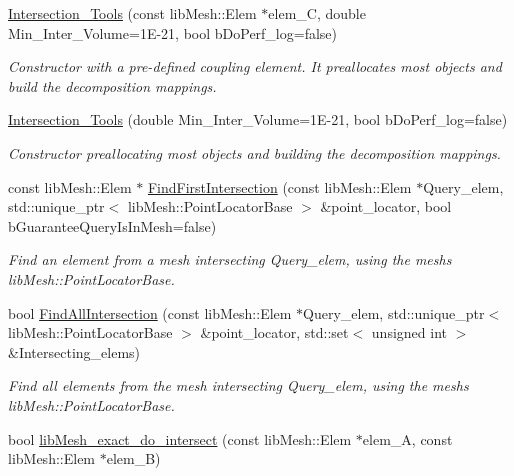 \begin{DoxyCompactItemize}
\item 
\hyperlink{classcarl_1_1_intersection___tools_aaa38c1df73695938d2fb032dfe305ef2}{Intersection\+\_\+\+Tools} (const lib\+Mesh\+::\+Elem $\ast$elem\+\_\+\+C, double Min\+\_\+\+Inter\+\_\+\+Volume=1\+E-\/21, bool b\+Do\+Perf\+\_\+log=false)
\begin{DoxyCompactList}\small\item\em Constructor with a pre-\/defined coupling element. It preallocates most objects and build the decomposition mappings. \end{DoxyCompactList}\item 
\hyperlink{classcarl_1_1_intersection___tools_a44115a8f785906bc1bed089fe92e526a}{Intersection\+\_\+\+Tools} (double Min\+\_\+\+Inter\+\_\+\+Volume=1\+E-\/21, bool b\+Do\+Perf\+\_\+log=false)
\begin{DoxyCompactList}\small\item\em Constructor preallocating most objects and building the decomposition mappings. \end{DoxyCompactList}\item 
const lib\+Mesh\+::\+Elem $\ast$ \hyperlink{classcarl_1_1_intersection___tools_a2e1ed1a0e6f1044108bf4ac77a25e8e0}{Find\+First\+Intersection} (const lib\+Mesh\+::\+Elem $\ast$Query\+\_\+elem, std\+::unique\+\_\+ptr$<$ lib\+Mesh\+::\+Point\+Locator\+Base $>$ \&point\+\_\+locator, bool b\+Guarantee\+Query\+Is\+In\+Mesh=false)
\begin{DoxyCompactList}\small\item\em Find an element from a mesh intersecting Query\+\_\+elem, using the mesh\textquotesingle{}s lib\+Mesh\+::\+Point\+Locator\+Base. \end{DoxyCompactList}\item 
bool \hyperlink{classcarl_1_1_intersection___tools_a8238069bd83ef1029c6a5b60a188763b}{Find\+All\+Intersection} (const lib\+Mesh\+::\+Elem $\ast$Query\+\_\+elem, std\+::unique\+\_\+ptr$<$ lib\+Mesh\+::\+Point\+Locator\+Base $>$ \&point\+\_\+locator, std\+::set$<$ unsigned int $>$ \&Intersecting\+\_\+elems)
\begin{DoxyCompactList}\small\item\em Find all elements from the mesh intersecting Query\+\_\+elem, using the mesh\textquotesingle{}s lib\+Mesh\+::\+Point\+Locator\+Base. \end{DoxyCompactList}\item 
bool \hyperlink{classcarl_1_1_intersection___tools_ae7b16748a45a0579bafecb48ef2fc4ce}{lib\+Mesh\+\_\+exact\+\_\+do\+\_\+intersect} (const lib\+Mesh\+::\+Elem $\ast$elem\+\_\+\+A, const lib\+Mesh\+::\+Elem $\ast$elem\+\_\+\+B)

\end{DoxyCompactItemize}
